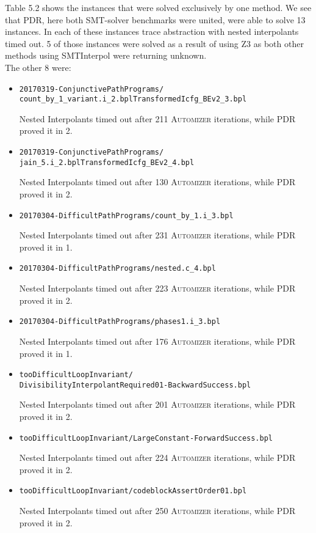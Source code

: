\documentclass[11pt, a4paper, BCOR=10mm, ngerman]{scrbook}
\begin{document}
Table 5.2 shows the instances that were solved exclusively by one method. We see that PDR, here both SMT-solver benchmarks were united, were able to solve 13 instances. In each of these instances trace abstraction with nested interpolants timed out. 5 of those instances were solved as a result of using Z3 as both other methods using SMTInterpol were returning unknown. \\ The other 8 were: 
\begin{itemize}
	\item  \texttt{20170319-ConjunctivePathPrograms/ \\ count\_by\_1\_variant.i\_2.bplTransformedIcfg\_BEv2\_3.bpl} \par
	Nested Interpolants timed out after 211 \textsc{Automizer} iterations, while PDR proved it in 2.
	
	\item  \texttt{20170319-ConjunctivePathPrograms/ \\ jain\_5.i\_2.bplTransformedIcfg\_BEv2\_4.bpl} \par
	Nested Interpolants timed out after 130 \textsc{Automizer} iterations, while PDR proved it in 2.
	
	
	\item \texttt{20170304-DifficultPathPrograms/count\_by\_1.i\_3.bpl}
	\par
	Nested Interpolants timed out after 231 \textsc{Automizer} iterations, while PDR proved it in 1.
	
	
	\item \texttt{20170304-DifficultPathPrograms/nested.c\_4.bpl}
	\par
	Nested Interpolants timed out after 223 \textsc{Automizer} iterations, while PDR proved it in 2.
	
	
	\item \texttt{20170304-DifficultPathPrograms/phases1.i\_3.bpl}
	\par
	Nested Interpolants timed out after 176 \textsc{Automizer} iterations, while PDR proved it in 1.
	
	
	\item \texttt{tooDifficultLoopInvariant/ \\ DivisibilityInterpolantRequired01-BackwardSuccess.bpl}
	\par
	Nested Interpolants timed out after 201 \textsc{Automizer} iterations, while PDR proved it in 2.
	
	
	\item \texttt{tooDifficultLoopInvariant/LargeConstant-ForwardSuccess.bpl}
	\par
	Nested Interpolants timed out after 224 \textsc{Automizer} iterations, while PDR proved it in 2.
	
	
	\item \texttt{tooDifficultLoopInvariant/codeblockAssertOrder01.bpl}
	\par
	Nested Interpolants timed out after 250 \textsc{Automizer} iterations, while PDR proved it in 2.
	
	
	
\end{itemize}
\end{document}
